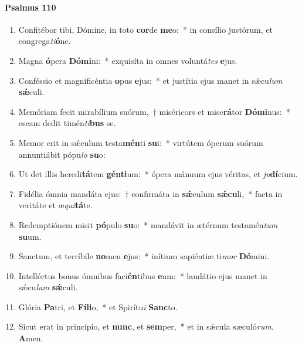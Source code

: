 \documentclass[twoside]{article}
\begin{document}
\begin{paracol}[1]{2}
\switchcolumn*
\paragraph{Psalmus 110}



\begin{enumerate}[wide, itemsep=0mm, labelwidth=!, labelindent=0pt, label=\color{gregoriocolor}\theenumi]
\item Confitébor tibi, Dómine, in toto \textbf{cor}de \textbf{me}o:~* in consílio justórum, et congrega\textit{ti}\textbf{ó}ne.
\item Magna \textbf{ó}pera \textbf{Dó}\textbf{mi}ni:~* exquisíta in omnes voluntá\textit{tes} \textbf{e}jus.
\item Conféssio et magnificéntia \textbf{o}pus \textbf{e}jus:~* et justítia ejus manet in sǽcu\textit{lum} \textbf{sǽ}culi.
\item Memóriam fecit mirabílium suórum,~† miséricors et mise\textbf{rá}tor \textbf{Dó}\textbf{mi}nus:~* escam dedit timén\textit{ti}\textbf{bus} se.
\item Memor erit in sǽculum testa\textbf{mén}ti \textbf{su}i:~* virtútem óperum suórum annuntiábit pópu\textit{lo} \textbf{su}o:
\item Ut det illis heredi\textbf{tá}tem \textbf{gén}\textbf{ti}um:~* ópera mánuum ejus véritas, et \textit{ju}\textbf{dí}cium.
\item Fidélia ómnia mandáta ejus:~† confirmáta in \textbf{sǽ}culum \textbf{sǽ}\textbf{cu}li,~* facta in veritáte et æ\textit{qui}\textbf{tá}te.
\item Redemptiónem misit \textbf{pó}pulo \textbf{su}o:~* mandávit in ætérnum testamén\textit{tum} \textbf{su}um.
\item {} Sanctum, et terríbile \textbf{no}men \textbf{e}jus:~* inítium sapiéntiæ ti\textit{mor} \textbf{Dó}mini.
\item Intelléctus bonus ómnibus faci\textbf{én}tibus \textbf{e}um:~* laudátio ejus manet in sǽcu\textit{lum} \textbf{sǽ}culi.
\item Glória \textbf{Pa}tri, et \textbf{Fí}\textbf{li}o,~* et Spirítu\textit{i} \textbf{Sanc}to.
\item Sicut erat in princípio, et \textbf{nunc}, et \textbf{sem}per,~* et in sǽcula sæculó\textit{rum}. \textbf{A}men.
\end{enumerate}

\switchcolumn


\end{paracol}
\end{document}
